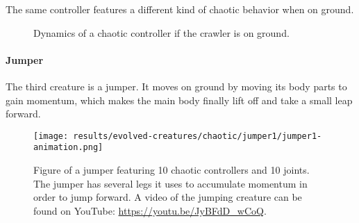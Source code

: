 \documentclass[main]{subfiles}
\begin{document}
The same controller features a different kind of chaotic behavior when on ground. %

\begin{figure}[H]
\centering
	\begin{minipage}{1.3\textwidth}
	\hspace*{-5em}
	\end{minipage}
\caption[On ground controller dynamics of the crawler]{Dynamics of a chaotic controller if the crawler is on ground.}
\label{figure:crawler1-on-ground-controller-dynamics}
\end{figure}

\paragraph{Jumper}

The third creature is a jumper. It moves on ground by moving its body parts to gain momentum, which makes the main body finally lift off and take a small leap forward.

\begin{figure}[H]
\centering
\texttt{[image: results/evolved-creatures/chaotic/jumper1/jumper1-animation.png]}
\caption[Figure of a jumper using chaotic controllers.]{Figure of a jumper featuring 10 chaotic controllers and 10 joints. The jumper has several legs it uses to accumulate momentum in order to jump forward. A video of the jumping creature can be found on YouTube: \url{https://youtu.be/JyBFdD_wCoQ}.}
\label{figure:successfulcreatures-chaotic-crawler1}
\end{figure} 
\end{document}
